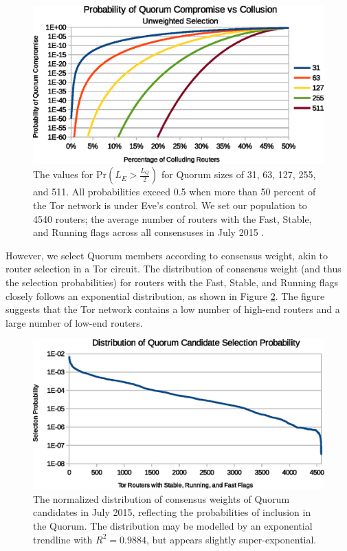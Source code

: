 \documentclass[USenglish,oneside,twocolumn]{article}
\begin{document}
\begin{figure}[h]
	\centering
	\includegraphics[width=\linewidth]{../assets/analysis/QuorumSelectionUnweighted.eps}
	\caption{The values for $ \mathrm{Pr}(L_{E} > \frac{L_{Q}}{2}) $ for Quorum sizes of 31, 63, 127, 255, and 511. All probabilities exceed 0.5 when more than 50 percent of the Tor network is under Eve's control. We set our population to 4540 routers; the average number of routers with the Fast, Stable, and Running flags across all consensuses in July 2015 \cite{TorMetrics}.}
	\label{fig:quorumUnweightedMajority}
\end{figure}

However, we select Quorum members according to consensus weight, akin to router selection in a Tor circuit. The distribution of consensus weight (and thus the selection probabilities) for routers with the Fast, Stable, and Running flags closely follows an exponential distribution, as shown in Figure \ref{fig:weightDist}. The figure suggests that the Tor network contains a low number of high-end routers and a large number of low-end routers.

\begin{figure}[h]
	\centering
	\includegraphics[width=\linewidth]{../assets/analysis/QuorumCandidateWeights.eps}
	\caption{The normalized distribution of consensus weights of Quorum candidates in July 2015, reflecting the probabilities of inclusion in the Quorum. The distribution may be modelled by an exponential trendline with $ R^{2} = 0.9884 $, but appears slightly super-exponential.}
	\label{fig:weightDist}
\end{figure}
\end{document}
